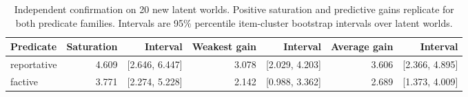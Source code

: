 \begin{table}[H]
\centering
\footnotesize
\setlength{\tabcolsep}{3pt}
\begin{tabular}{lrrrrrr}
\toprule
Predicate & Saturation & Interval & Weakest gain & Interval & Average gain & Interval \\
\midrule
reportative & 4.609 & [2.646, 6.447] & 3.078 & [2.029, 4.203] & 3.606 & [2.366, 4.895] \\
factive & 3.771 & [2.274, 5.228] & 2.142 & [0.988, 3.362] & 2.689 & [1.373, 4.009] \\
\bottomrule
\end{tabular}
\caption{Independent confirmation on 20 new latent worlds. Positive saturation and predictive gains replicate for both predicate families. Intervals are 95\% percentile item-cluster bootstrap intervals over latent worlds.}
\label{tab:independent-saturation}
\end{table}
